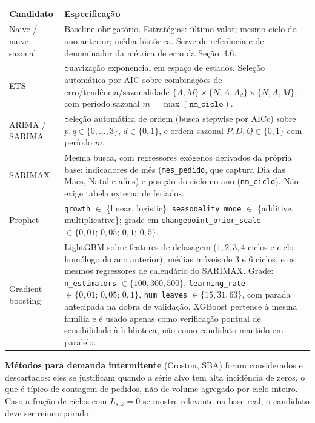 \documentclass[11pt]{article}
\begin{document}
\begin{center}
\begin{tabular}{@{}p{3.4cm}p{10.2cm}@{}}
\toprule
Candidato & Especificação \\
\midrule
Naive / naive sazonal &
  Baseline obrigatório. Estratégias: último valor; mesmo ciclo do ano
  anterior; média histórica. Serve de referência e de denominador da
  métrica de erro da Seção~4.6. \\
ETS &
  Suavização exponencial em espaço de estados. Seleção automática por AIC
  sobre combinações de erro/tendência/sazonalidade
  $\{A,M\} \times \{N,A,A_d\} \times \{N,A,M\}$, com período sazonal
  $m = \max(\texttt{nm\_ciclo})$. \\
ARIMA / SARIMA &
  Seleção automática de ordem (busca stepwise por AICc) sobre
  $p,q \in \{0,\dots,3\}$, $d \in \{0,1\}$, e ordem sazonal
  $P,D,Q \in \{0,1\}$ com período $m$. \\
SARIMAX &
  Mesma busca, com regressores exógenos derivados da própria base:
  indicadores de mês (\texttt{mes\_pedido}, que captura Dia das Mães,
  Natal e afins) e posição do ciclo no ano (\texttt{nm\_ciclo}). Não exige
  tabela externa de feriados. \\
Prophet &
  \texttt{growth} $\in$ \{linear, logistic\}; \texttt{seasonality\_mode}
  $\in$ \{additive, multiplicative\}; grade em
  \texttt{changepoint\_prior\_scale} $\in \{0{,}01;\,0{,}05;\,0{,}1;\,0{,}5\}$. \\
Gradient boosting &
  LightGBM sobre features de defasagem ($1,2,3,4$ ciclos e ciclo homólogo
  do ano anterior), médias móveis de 3 e 6 ciclos, e os mesmos regressores
  de calendário do SARIMAX. Grade:
  \texttt{n\_estimators} $\in \{100,300,500\}$,
  \texttt{learning\_rate} $\in \{0{,}01;\,0{,}05;\,0{,}1\}$,
  \texttt{num\_leaves} $\in \{15,31,63\}$, com parada antecipada na dobra
  de validação. XGBoost pertence à mesma família e é usado apenas como
  verificação pontual de sensibilidade à biblioteca, não como candidato
  mantido em paralelo. \\
\bottomrule
\end{tabular}
\end{center}

\noindent \textbf{Métodos para demanda intermitente} (Croston, SBA) foram
considerados e descartados: eles se justificam quando a série alvo tem
alta incidência de zeros, o que é típico de contagem de pedidos, não de
volume agregado por ciclo inteiro. Caso a fração de ciclos com
$L_{s,k}=0$ se mostre relevante na base real, o candidato deve ser
reincorporado.
\end{document}
